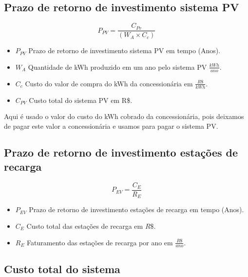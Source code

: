 \subsection{Prazo de retorno de investimento sistema PV}

\begin{equation}
    P_{PV} = \frac{C_{Pv}}{ (W_{A} \times C_{c})}
    \label{eq:PV_custo}
\end{equation}

\begin{itemize}
  \item $P_{PV}$ Prazo de retorno de investimento sistema PV em tempo (Anos).

  \item $W_{A}$ Quantidade de kWh produzido em um ano pelo sistema PV $\frac{kWh}{ano}$.
    
  \item $C_{c}$ Custo do valor de compra do kWh da concessionária em $\frac{R\$}{kWh}$.

  \item $C_{PV}$ Custo total do sistema PV em R\$.

\end{itemize}

Aqui é usado o valor do custo do kWh cobrado da concessionária, pois deixamos de pagar este valor a concessionária e usamos para pagar o sistema PV.

\newpage
\subsection{Prazo de retorno de investimento estações de recarga}

\begin{equation}
    P_{EV} = \frac{C_{E}}{ R_{E}}
    \label{eq:EV_custo}
\end{equation}

\begin{itemize}
  \item $P_{EV}$ Prazo de retorno de investimento estações de recarga em tempo  (Anos).

  \item $C_{E}$ Custo total das estações de recarga em $R\$$.
  
  \item $R_{E}$ Faturamento das estações de recarga por ano em $\frac{R\$}{ano}$.

\end{itemize}

\subsection{Custo total do sistema}

